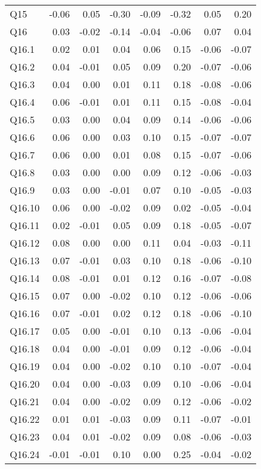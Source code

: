 \documentclass[
]{article}
\begin{document}
\begin{center}
\begin{longtable}{lrrrrrrr}
\addlinespace
Q15 & -0.06 & 0.05 & -0.30 & -0.09 & -0.32 & 0.05 & 0.20\\
Q16 & 0.03 & -0.02 & -0.14 & -0.04 & -0.06 & 0.07 & 0.04\\
Q16.1 & 0.02 & 0.01 & 0.04 & 0.06 & 0.15 & -0.06 & -0.07\\
Q16.2 & 0.04 & -0.01 & 0.05 & 0.09 & 0.20 & -0.07 & -0.06\\
Q16.3 & 0.04 & 0.00 & 0.01 & 0.11 & 0.18 & -0.08 & -0.06\\
\addlinespace
Q16.4 & 0.06 & -0.01 & 0.01 & 0.11 & 0.15 & -0.08 & -0.04\\
Q16.5 & 0.03 & 0.00 & 0.04 & 0.09 & 0.14 & -0.06 & -0.06\\
Q16.6 & 0.06 & 0.00 & 0.03 & 0.10 & 0.15 & -0.07 & -0.07\\
Q16.7 & 0.06 & 0.00 & 0.01 & 0.08 & 0.15 & -0.07 & -0.06\\
Q16.8 & 0.03 & 0.00 & 0.00 & 0.09 & 0.12 & -0.06 & -0.03\\
\addlinespace
Q16.9 & 0.03 & 0.00 & -0.01 & 0.07 & 0.10 & -0.05 & -0.03\\
Q16.10 & 0.06 & 0.00 & -0.02 & 0.09 & 0.02 & -0.05 & -0.04\\
Q16.11 & 0.02 & -0.01 & 0.05 & 0.09 & 0.18 & -0.05 & -0.07\\
Q16.12 & 0.08 & 0.00 & 0.00 & 0.11 & 0.04 & -0.03 & -0.11\\
Q16.13 & 0.07 & -0.01 & 0.03 & 0.10 & 0.18 & -0.06 & -0.10\\
\addlinespace
Q16.14 & 0.08 & -0.01 & 0.01 & 0.12 & 0.16 & -0.07 & -0.08\\
Q16.15 & 0.07 & 0.00 & -0.02 & 0.10 & 0.12 & -0.06 & -0.06\\
Q16.16 & 0.07 & -0.01 & 0.02 & 0.12 & 0.18 & -0.06 & -0.10\\
Q16.17 & 0.05 & 0.00 & -0.01 & 0.10 & 0.13 & -0.06 & -0.04\\
Q16.18 & 0.04 & 0.00 & -0.01 & 0.09 & 0.12 & -0.06 & -0.04\\
\addlinespace
Q16.19 & 0.04 & 0.00 & -0.02 & 0.10 & 0.10 & -0.07 & -0.04\\
Q16.20 & 0.04 & 0.00 & -0.03 & 0.09 & 0.10 & -0.06 & -0.04\\
Q16.21 & 0.04 & 0.00 & -0.02 & 0.09 & 0.12 & -0.06 & -0.02\\
Q16.22 & 0.01 & 0.01 & -0.03 & 0.09 & 0.11 & -0.07 & -0.01\\
Q16.23 & 0.04 & 0.01 & -0.02 & 0.09 & 0.08 & -0.06 & -0.03\\
\addlinespace
Q16.24 & -0.01 & -0.01 & 0.10 & 0.00 & 0.25 & -0.04 & -0.02\\

\end{longtable}
\end{center}
\end{document}
